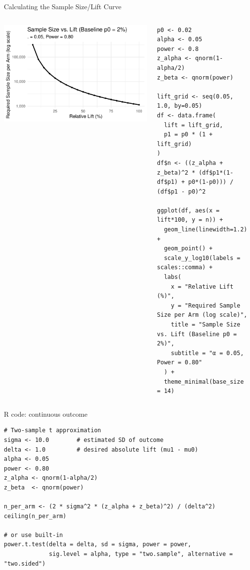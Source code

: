 \documentclass[aspectratio=169,11pt]{beamer}
\begin{document}
\begin{frame}[fragile]{Calculating the Sample Size/Lift Curve}
\begin{columns}
\begin{column}{0.5\textwidth}
\begin{center}
\includegraphics[width=\textwidth]{power_plot} 
\end{center}
\end{column}
\begin{column}{0.5\textwidth} 
\begin{lstlisting}
p0 <- 0.02
alpha <- 0.05
power <- 0.8
z_alpha <- qnorm(1-alpha/2)
z_beta <- qnorm(power)

lift_grid <- seq(0.05, 1.0, by=0.05)
df <- data.frame(
  lift = lift_grid,
  p1 = p0 * (1 + lift_grid)
)
df$n <- ((z_alpha + z_beta)^2 * (df$p1*(1-df$p1) + p0*(1-p0))) / (df$p1 - p0)^2

ggplot(df, aes(x = lift*100, y = n)) +
  geom_line(linewidth=1.2) +
  geom_point() +
  scale_y_log10(labels = scales::comma) +
  labs(
    x = "Relative Lift (%)",
    y = "Required Sample Size per Arm (log scale)",
    title = "Sample Size vs. Lift (Baseline p0 = 2%)",
    subtitle = "α = 0.05, Power = 0.80"
  ) +
  theme_minimal(base_size = 14)
\end{lstlisting}
\end{column}
\end{columns}
\end{frame}




\begin{frame}[fragile]{R code: continuous outcome}
\begin{lstlisting}
# Two-sample t approximation
sigma <- 10.0        # estimated SD of outcome
delta <- 1.0         # desired absolute lift (mu1 - mu0)
alpha <- 0.05
power <- 0.80
z_alpha <- qnorm(1-alpha/2)
z_beta  <- qnorm(power)

n_per_arm <- (2 * sigma^2 * (z_alpha + z_beta)^2) / (delta^2)
ceiling(n_per_arm)

# or use built-in
power.t.test(delta = delta, sd = sigma, power = power,
             sig.level = alpha, type = "two.sample", alternative = "two.sided")
\end{lstlisting}
\end{frame}
\end{document}
